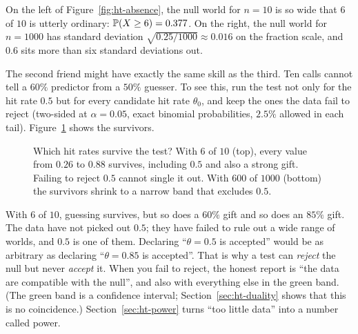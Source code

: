 On the left of Figure~\ref{fig:ht-absence}, the null world for $n=10$ is so wide
that $6$ of $10$ is utterly ordinary: $\P(X \ge 6) = 0.377$. On the right, the null
world for $n=1000$ has standard deviation $\sqrt{0.25/1000}\approx 0.016$ on the
fraction scale, and $0.6$ sits more than six standard deviations out.

The second friend might have exactly the same skill as the third. Ten calls
cannot tell a $60\%$ predictor from a $50\%$ guesser. To see this, run the test not
only for the hit rate $0.5$ but for every candidate hit rate $\theta_0$, and keep
the ones the data fail to reject (two-sided at $\alpha=0.05$, exact binomial
probabilities, $2.5\%$ allowed in each tail). Figure~\ref{fig:ht-survivors} shows the survivors.

\begin{figure}[H]
\centering
{}
\caption{Which hit rates survive the test? With $6$ of $10$ (top), every value from
$0.26$ to $0.88$ survives, including $0.5$ and also a strong gift. Failing to reject
$0.5$ cannot single it out. With $600$ of $1000$ (bottom) the survivors shrink to a
narrow band that excludes $0.5$.}
\label{fig:ht-survivors}
\end{figure}

With $6$ of $10$, guessing survives, but so does a $60\%$ gift and so does an $85\%$
gift. The data have not picked out $0.5$; they have failed to rule out a wide range
of worlds, and $0.5$ is one of them. Declaring ``$\theta=0.5$ is accepted'' would be
as arbitrary as declaring ``$\theta=0.85$ is accepted''. That is why a test can
\emph{reject} the null but never \emph{accept} it. When you fail to reject, the
honest report is ``the data are compatible with the null'', and also with
everything else in the green band. (The green band is a confidence interval; Section~\ref{sec:ht-duality}
shows that this is no coincidence.) Section~\ref{sec:ht-power} turns ``too little
data'' into a number called power.

